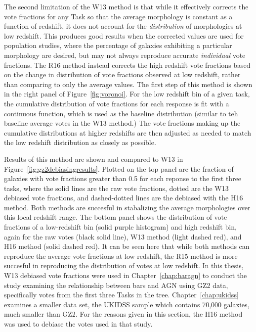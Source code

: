 The second limitation of the W13 method is that while it effectively corrects the vote fractions for any Task so that the average morphology is constant as a function of redshift, it does not account for the \emph{distribution} of morphologies at low redshift. This produces good results when the corrected values are used for population studies, where the percentage of galaxies exhibiting a particular morphology are desired, but may not always reproduce accurate \emph{individual} vote fractions. The R16 method instead corrects the high redshift vote fractions based on the change in distribution of vote fractions observed at low redshift, rather than comparing to only the average values. The first step of this method is shown in the right panel of Figure~\ref{fig:voronoi}. For the low redshift bin of a given task, the cumulative distribution of vote fractions for each response is fit with a continuous function, which is used as the baseline distribution (similar to teh baseline average votes in the W13 method.) The vote fractions making up the cumulative distributions at higher redshifts are then adjusted as needed to match the low redshift distribution as closely as possible.

Results of this method are shown and compared to W13 in Figure~\ref{fig:gz2debiasingresults}. Plotted on the top panel are the fraction of galaxies with vote fractions greater than 0.5 for each reponse to the first three tasks, where the solid lines are the raw vote fractions, dotted are the W13 debiased vote fractions, and dashed-dotted lines are the debiased with the H16 method.  Both methods are succesful in stabalizing the average morphologies over this local redshift range. The bottom panel shows the distribution of vote fractions of a low-redshift bin (solid purple histogram) and high redshift bin, again for the raw votes (black solid line), W13 method (light dashed red), and H16 method (solid dashed red). It can be seen here that while both methods can reproduce the average vote fractions at low redshift, the R15 method is more succesful in reproducing the distribution of votes at low redshift. In this thesis, W13 debiased vote fractions were used in Chapter~\ref{chap:baragn} to conduct the study examining the relationship between bars and AGN using GZ2 data, specifically votes from the first three Tasks in the tree. Chapter~\ref{chap:ukidss} examines a smaller data set, the UKIDSS sample which contains 70,000 galaxies, much smaller than GZ2. For the reasons given in this section, the H16 method was used to debiase the votes used in that study. 
 



